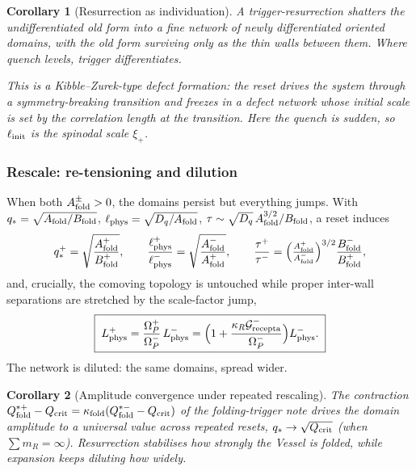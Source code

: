 \documentclass[11pt,a4paper]{article}
\newcommand{\Op}{\Omega_P}
\newcommand{\Qf}{Q_{\rm fold}}
\newcommand{\Af}{A_{\rm fold}}
\newcommand{\Bf}{B_{\rm fold}}
\newcommand{\Dq}{D_q}
\newcommand{\Grec}{\mathcal{G}_{\rm recepta}}
\newcommand{\note}[1]{\textcolor{black!65}{\emph{#1}}}
\theoremstyle{plain}
\newtheorem{corollary}{Corollary}[section]
\theoremstyle{definition}
\theoremstyle{remark}
\begin{document}
\begin{corollary}[Resurrection as individuation]
A trigger-resurrection shatters the undifferentiated old form into a fine network of newly differentiated
oriented domains, with the old form surviving only as the thin walls between them. Where quench levels,
trigger differentiates.
\end{corollary}

\note{This is a Kibble--Zurek-type defect formation: the reset drives the system through a
symmetry-breaking transition and freezes in a defect network whose initial scale is set by the
correlation length at the transition. Here the quench is sudden, so $\ell_{\rm init}$ is the spinodal
scale $\xi_+$.}

\subsubsection{Rescale: re-tensioning and dilution}

When both $\Af^\pm>0$, the domains persist but everything jumps. With $q_\ast=\sqrt{\Af/\Bf}$,
$\ell_{\rm phys}=\sqrt{\Dq/\Af}$, $\tau\sim\sqrt{\Dq}\,\Af^{3/2}/\Bf$, a reset induces
\begin{equation}
q_\ast^{+}=\sqrt{\frac{\Af^+}{\Bf^+}},\qquad
\frac{\ell_{\rm phys}^+}{\ell_{\rm phys}^-}=\sqrt{\frac{\Af^-}{\Af^+}},\qquad
\frac{\tau^+}{\tau^-}=\Bigl(\tfrac{\Af^+}{\Af^-}\Bigr)^{3/2}\frac{\Bf^-}{\Bf^+},
\end{equation}
and, crucially, the comoving topology is untouched while proper inter-wall separations are stretched by
the scale-factor jump,
\begin{equation}
\boxed{\;L_{\rm phys}^{+}=\frac{\Op^+}{\Op^-}\,L_{\rm phys}^{-}=\Bigl(1+\frac{\kappa_R\Grec^-}{\Op^-}\Bigr)L_{\rm phys}^{-}.\;}
\end{equation}
The network is diluted: the same domains, spread wider.

\begin{corollary}[Amplitude convergence under repeated rescaling]
The contraction $\Qf^{*+}-Q_{\rm crit}=\kappa_{\rm fold}(\Qf^{*-}-Q_{\rm crit})$ of the folding-trigger
note drives the domain amplitude to a universal value across repeated resets,
$q_\ast\to\sqrt{Q_{\rm crit}}$ (when $\sum m_R=\infty$). Resurrection stabilises \emph{how strongly} the
Vessel is folded, while expansion keeps diluting \emph{how widely}.
\end{corollary}
\end{document}

